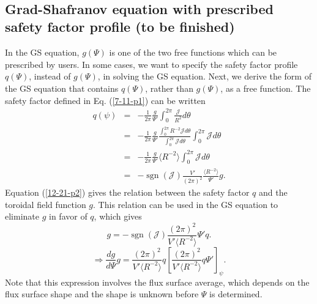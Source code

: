 \documentclass{article}
\newcommand{\tmop}[1]{\ensuremath{\operatorname{#1}}}
\begin{document}
\

\subsection{Grad-Shafranov equation with prescribed safety factor profile (to
be finished)}

In the GS equation, $g (\Psi)$ is one of the two free functions which can be
prescribed by users. In some cases, we want to specify the safety factor
profile $q (\Psi)$, instead of $g (\Psi)$, in solving the GS equation. Next,
we derive the form of the GS equation that contains $q (\Psi)$, rather than $g
(\Psi)$, as a free function. The safety factor defined in Eq. (\ref{7-11-p1})
can be written
\begin{eqnarray}
  q (\psi) & = & - \frac{1}{2 \pi}  \frac{g}{\Psi'} \int_0^{2 \pi}
  \frac{\mathcal{J}}{R^2} d \theta \\
  & = & - \frac{1}{2 \pi}  \frac{g}{\Psi'}  \frac{\int_0^{2 \pi} R^{- 2}
  \mathcal{J}d \theta}{\int_0^{2 \pi} \mathcal{J}d \theta} \int_0^{2 \pi}
  \mathcal{J}d \theta \nonumber\\
  & = & - \frac{1}{2 \pi}  \frac{g}{\Psi'} \langle R^{- 2} \rangle \int_0^{2
  \pi} \mathcal{J}d \theta \\
  & = & - \tmop{sgn} (\mathcal{J}) \frac{V'}{(2 \pi)^2}  \frac{\langle R^{-
  2} \rangle}{\Psi'} g.  \label{12-21-p2}
\end{eqnarray}
Equation (\ref{12-21-p2}) gives the relation between the safety factor $q$ and
the toroidal field function $g$. This relation can be used in the GS equation
to eliminate $g$ in favor of $q$, which gives
\begin{equation}
  g = - \tmop{sgn} (\mathcal{J}) \frac{(2 \pi)^2}{V' \langle R^{- 2} \rangle}
  \Psi' q.
\end{equation}
\begin{equation}
  \label{4-18-p3} \Rightarrow \frac{d g}{d \Psi} g = \frac{(2 \pi)^2}{V'
  \langle R^{- 2} \rangle} q \left[ \frac{(2 \pi)^2}{V' \langle R^{- 2}
  \rangle} q \Psi' \right]_{\psi} .
\end{equation}
Note that this expression involves the flux surface average, which depends on
the flux surface shape and the shape is unknown before $\Psi$ is determined.
\end{document}
